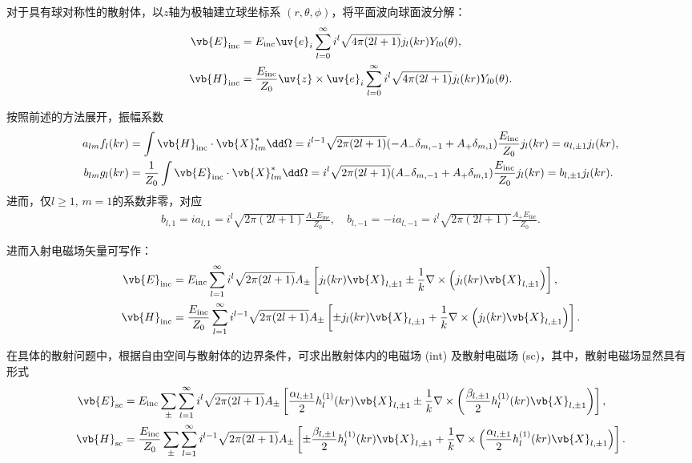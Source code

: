 对于具有球对称性的散射体，以\(z\)轴为极轴建立球坐标系 \((r,\theta,\phi)\)，将平面波向球面波分解：
\begin{align*}
	\vb{E}_{\text{inc}} & = E_{\text{inc}}\uv{e}_i\sum_{l=0}^{\infty}i^l\sqrt{4\pi(2l+1)}j_l(kr)Y_{l0}(\theta),                         \\
	\vb{H}_{\text{inc}} & = \frac{E_{\text{inc}}}{Z_0}\uv{z}\times\uv{e}_i\sum_{l=0}^{\infty}i^l\sqrt{4\pi(2l+1)}j_l(kr)Y_{l0}(\theta).
\end{align*}

按照前述的方法展开，振幅系数
\begin{align*}
	a_{lm}f_l(kr) & = \int\vb{H}_{\text{inc}}\cdot\vb{X}_{lm}^*\dd \Omega = i^{l-1}\sqrt{2\pi(2l+1)}(-A_-\delta_{m,-1}+A_+\delta_{m,1})\frac{E_{\text{inc}}}{Z_0}j_l(kr) = a_{l,\pm1}j_l(kr),         \\
	b_{lm}g_l(kr) & = \frac{1}{Z_0}\int\vb{E}_{\text{inc}}\cdot\vb{X}_{lm}^*\dd \Omega = i^l\sqrt{2\pi(2l+1)}(A_-\delta_{m,-1}+A_+\delta_{m,1})\frac{E_{\text{inc}}}{Z_0}j_l(kr) = b_{l,\pm1}j_l(kr).
\end{align*}
进而，仅\(l\geq1,\,m=1\)的系数非零，对应
\begin{align*}
	b_{l,1}=ia_{l,1}=i^l\sqrt{2\pi(2l+1)}\frac{A_-E_{\text{inc}}}{Z_0},\quad b_{l,-1}=-ia_{l,-1}=i^l\sqrt{2\pi(2l+1)}\frac{A_+E_{\text{inc}}}{Z_0}.
\end{align*}

进而入射电磁场矢量可写作：
\begin{align*}
	\vb{E}_{\text{inc}} & = E_{\text{inc}}\sum_{l=1}^{\infty}i^l\sqrt{2\pi(2l+1)}A_{\pm}\left[j_l(kr)\vb{X}_{l,\pm1}\pm\frac{1}{k}\nabla\times\left(j_l(kr)\vb{X}_{l,\pm1}\right)\right],                   \\
	\vb{H}_{\text{inc}} & = \frac{E_{\text{inc}}}{Z_0}\sum_{l=1}^{\infty}i^{l-1}\sqrt{2\pi(2l+1)}A_{\pm}\left[\pm j_l(kr)\vb{X}_{l,\pm1}+\frac{1}{k}\nabla\times\left(j_l(kr)\vb{X}_{l,\pm1}\right)\right].
\end{align*}

在具体的散射问题中，根据自由空间与散射体的边界条件，可求出散射体内的电磁场 (int) 及散射电磁场 (sc)，其中，散射电磁场显然具有形式
\begin{align*}
	\vb{E}_{\text{sc}} & = E_{\text{inc}}\sum_{\pm}\sum_{l=1}^{\infty}i^l\sqrt{2\pi(2l+1)}A_{\pm}\left[\frac{\alpha_{l,\pm1}}{2}h_l^{(1)}(kr)\vb{X}_{l,\pm1}\pm\frac{1}{k}\nabla\times\left(\frac{\beta_{l,\pm1}}{2}h_l^{(1)}(kr)\vb{X}_{l,\pm1}\right)\right],                  \\
	\vb{H}_{\text{sc}} & = \frac{E_{\text{inc}}}{Z_0}\sum_{\pm}\sum_{l=1}^{\infty}i^{l-1}\sqrt{2\pi(2l+1)}A_{\pm}\left[\pm\frac{\beta_{l,\pm1}}{2}h_l^{(1)}(kr)\vb{X}_{l,\pm1}+\frac{1}{k}\nabla\times\left(\frac{\alpha_{l,\pm1}}{2}h_l^{(1)}(kr)\vb{X}_{l,\pm1}\right)\right].
\end{align*}

